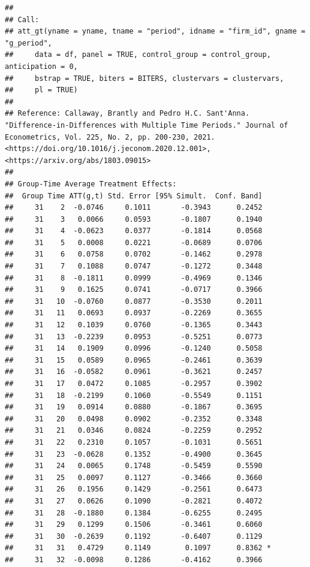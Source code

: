 \documentclass[
]{article}
\begin{document}
\begin{verbatim}
## 
## Call:
## att_gt(yname = yname, tname = "period", idname = "firm_id", gname = "g_period", 
##     data = df, panel = TRUE, control_group = control_group, anticipation = 0, 
##     bstrap = TRUE, biters = BITERS, clustervars = clustervars, 
##     pl = TRUE)
## 
## Reference: Callaway, Brantly and Pedro H.C. Sant'Anna.  "Difference-in-Differences with Multiple Time Periods." Journal of Econometrics, Vol. 225, No. 2, pp. 200-230, 2021. <https://doi.org/10.1016/j.jeconom.2020.12.001>, <https://arxiv.org/abs/1803.09015> 
## 
## Group-Time Average Treatment Effects:
##  Group Time ATT(g,t) Std. Error [95% Simult.  Conf. Band]  
##     31    2  -0.0746     0.1011       -0.3943      0.2452  
##     31    3   0.0066     0.0593       -0.1807      0.1940  
##     31    4  -0.0623     0.0377       -0.1814      0.0568  
##     31    5   0.0008     0.0221       -0.0689      0.0706  
##     31    6   0.0758     0.0702       -0.1462      0.2978  
##     31    7   0.1088     0.0747       -0.1272      0.3448  
##     31    8  -0.1811     0.0999       -0.4969      0.1346  
##     31    9   0.1625     0.0741       -0.0717      0.3966  
##     31   10  -0.0760     0.0877       -0.3530      0.2011  
##     31   11   0.0693     0.0937       -0.2269      0.3655  
##     31   12   0.1039     0.0760       -0.1365      0.3443  
##     31   13  -0.2239     0.0953       -0.5251      0.0773  
##     31   14   0.1909     0.0996       -0.1240      0.5058  
##     31   15   0.0589     0.0965       -0.2461      0.3639  
##     31   16  -0.0582     0.0961       -0.3621      0.2457  
##     31   17   0.0472     0.1085       -0.2957      0.3902  
##     31   18  -0.2199     0.1060       -0.5549      0.1151  
##     31   19   0.0914     0.0880       -0.1867      0.3695  
##     31   20   0.0498     0.0902       -0.2352      0.3348  
##     31   21   0.0346     0.0824       -0.2259      0.2952  
##     31   22   0.2310     0.1057       -0.1031      0.5651  
##     31   23  -0.0628     0.1352       -0.4900      0.3645  
##     31   24   0.0065     0.1748       -0.5459      0.5590  
##     31   25   0.0097     0.1127       -0.3466      0.3660  
##     31   26   0.1956     0.1429       -0.2561      0.6473  
##     31   27   0.0626     0.1090       -0.2821      0.4072  
##     31   28  -0.1880     0.1384       -0.6255      0.2495  
##     31   29   0.1299     0.1506       -0.3461      0.6060  
##     31   30  -0.2639     0.1192       -0.6407      0.1129  
##     31   31   0.4729     0.1149        0.1097      0.8362 *
##     31   32  -0.0098     0.1286       -0.4162      0.3966  

\end{verbatim}
\end{document}
